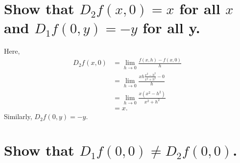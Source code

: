 \begin{parts}
    \part{
        Show that $D_2f(x,0)=x$ for all
        $x$ and $D_1f(0,y)=-y$ for all
        y.
    }
    \begin{solution}
        Here,
        \begin{align*}
            D_2f(x,0)&=\lim_{h\to 0}{
                \frac{f(x,h)-f(x,0)}
                {h}
            }\\
            &=\lim_{h\to 0}{
            \frac{xh\frac{x^2-h^2
            }{x^2+h^2}-0}{h}}\\
            &=\lim_{h\to 0}{\frac
            {x(x^2-h^2)}{x^2+h^2}}\\
            &=x.
        \end{align*}
        Similarly, $D_2f(0,y)=-y$.
    \end{solution}

    \part{
        Show that $D_1f(0,0)\ne D_2
        f(0,0)$.
    }
    \begin{solution}
        
    \end{solution}
\end{parts}